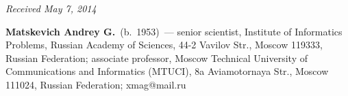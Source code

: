  \vspace*{-6pt}

 \hfill{\small\textit{Received May 7, 2014}}

 \vspace*{-18pt}

 \Contrl

 \noindent
\textbf{Matskevich Andrey G.}~(b.~1953)~---
 senior scientist, Institute of Informatics Problems, Russian Academy of Sciences,
 44-2 Vavilov Str., Moscow 119333, Russian Federation;
 associate professor, Moscow Technical University of Communications and Informatics
(MTUCI),  8a Aviamotornaya Str., Moscow 111024, Russian Federation;  xmag@mail.ru




 \label{end\stat}

 \renewcommand{\bibname}{\protect\rm Литература}